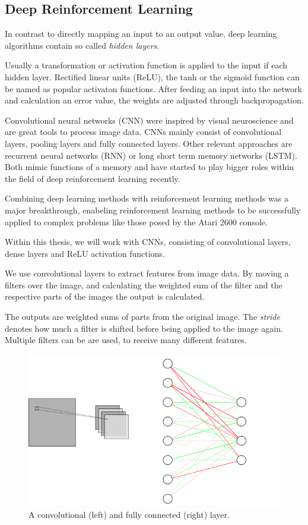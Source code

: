\subsection{Deep Reinforcement Learning}
In contrast to directly mapping an input to an output value, deep learning algorithms contain so called \textit{hidden layers}.


Usually a transformation or activation function is applied to the input if each hidden layer. Rectified linear units (ReLU), the tanh or the sigmoid function can be named as popular activaton functions.
After feeding an input into the network and calculation an error value, the weights are adjusted through backpropagation.

Convolutional neural networks (CNN) were inspired by visual neuroscience and are great tools to process image data. CNNs mainly consist of convolutional layers, pooling layers and fully connected layers.
Other relevant approaches are recurrent neural networks (RNN) or long short term memory networks (LSTM). Both mimic functions of a memory and have started to play bigger roles within the field of deep reinforcement learning recently.

Combining deep learning methods with reinforcement learning methods was a major breakthrough, enabeling reinforcement learning methods to be successfully applied to complex problems like those posed by the Atari 2600 console. \citep{deeprlLi}

Within this thesis, we will work with CNNs, consisting of convolutional layers, dense layers and ReLU activation functions.

We use convolutional layers to extract features from image data. By moving a filters over the image, and calculating the weighted sum of the filter and the respective parts of the images the output is calculated. 

The outputs are weighted sums of parts from the original image.
The \textit{stride} denotes how much a filter is shifted before being applied to the image again. Multiple filters can be are used, to receive many different features.

\begin{figure}
\includegraphics[scale=0.5]{bilder/deeplayers.png}
\caption{A convolutional (left) and fully connected (right) layer.
}
\label{networks}
\end{figure}

